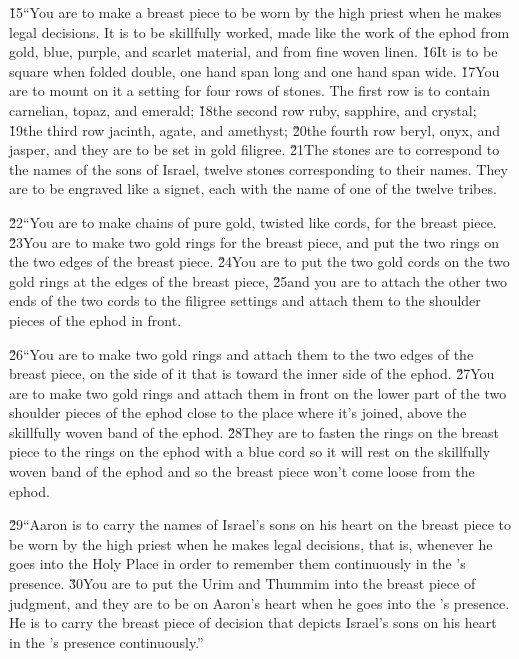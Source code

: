 \v{15}``You are to make a breast piece to be worn by the high priest when he makes legal decisions. It is to be skillfully worked, made like the work of the ephod from gold, blue, purple, and scarlet material, and from fine woven linen. \v{16}It is to be square when folded double, one hand span long and one hand span wide. \v{17}You are to mount on it a setting for four rows of stones. The first row is to contain carnelian, topaz, and emerald; \v{18}the second row ruby, sapphire, and crystal; \v{19}the third row jacinth, agate, and amethyst; \v{20}the fourth row beryl, onyx, and jasper, and they are to be set in gold filigree. \v{21}The stones are to correspond to the names of the sons of Israel, twelve stones corresponding to their names. They are to be engraved like a signet, each with the name of one of the twelve tribes.

\v{22}``You are to make chains of pure gold, twisted like cords, for the breast piece. \v{23}You are to make two gold rings for the breast piece, and put the two rings on the two edges of the breast piece. \v{24}You are to put the two gold cords on the two gold rings at the edges of the breast piece, \v{25}and you are to attach the other two ends of the two cords to the filigree settings and attach them to the shoulder pieces of the ephod in front.

\v{26}``You are to make two gold rings and attach them to the two edges of the breast piece, on the side of it that is toward the inner side of the ephod. \v{27}You are to make two gold rings and attach them in front on the lower part of the two shoulder pieces of the ephod close to the place where it's joined, above the skillfully woven band of the ephod. \v{28}They are to fasten the rings on the breast piece to the rings on the ephod with a blue cord so it will rest on the skillfully woven band of the ephod and so the breast piece won't come loose from the ephod.

\v{29}``Aaron is to carry the names of Israel's sons on his heart on the breast piece to be worn by the high priest when he makes legal decisions, that is, whenever he goes into the Holy Place in order to remember them continuously in the 's presence. \v{30}You are to put the Urim and Thummim into the breast piece of judgment, and they are to be on Aaron's heart when he goes into the 's presence. He is to carry the breast piece of decision that depicts Israel's sons on his heart in the 's presence continuously.''

